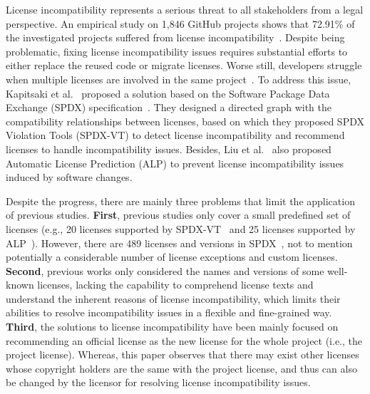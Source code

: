 License incompatibility represents a serious threat to all stakeholders from a legal perspective. An empirical study on 1,846 GitHub projects shows that 72.91\% of the investigated projects suffered from license incompatibility~\cite{xu2021lidetector}. Despite being problematic, fixing license incompatibility issues requires substantial efforts to either replace the reused code or migrate licenses. Worse still, developers struggle when multiple licenses are involved in the same project~\cite{almeida2017software}. To address this issue, Kapitsaki et al.~\cite{jss`17-Kapitsaki-SPDX,kapitsaki2019modeling} proposed a solution based on the Software Package Data Exchange (SPDX) specification~\cite{spdx}. They designed a directed graph with the compatibility relationships between licenses, based on which
they proposed SPDX Violation Tools (SPDX-VT) to detect license incompatibility and recommend licenses to handle incompatibility issues. Besides, Liu et al.~\cite{liu2019predicting} also proposed Automatic License Prediction (ALP) to prevent license incompatibility issues induced by software changes. 

Despite the progress, there are mainly three problems that limit the application of previous studies. \textbf{First}, previous studies only cover a small predefined set of licenses (e.g., 20 licenses supported by SPDX-VT~\cite{kapitsaki2019modeling} and 25 licenses supported by ALP~\cite{liu2019predicting}). However, there are 489 licenses and versions in SPDX~\cite{spdx}, not to mention potentially a considerable %
{number} of license exceptions and custom licenses. \textbf{Second}, previous works only considered the names and versions of some well-known licenses, lacking the capability to comprehend license texts and understand the inherent reasons of license incompatibility, which limits their abilities to resolve incompatibility issues in a flexible and fine-grained way. %
\textbf{Third}, the solutions to license incompatibility have been mainly focused on recommending an official license as the new license for the whole project (i.e., the project license). Whereas, %
this paper observes that %
there may exist other licenses whose copyright holders are the same with the project license, and thus can also be changed by the licensor for resolving license incompatibility issues. 

